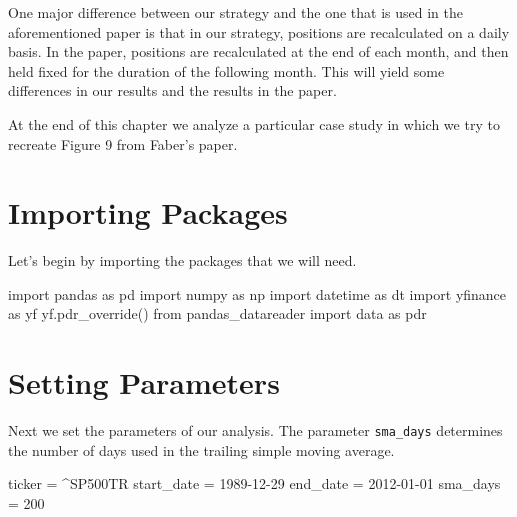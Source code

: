 \documentclass[
  letterpaper,
  DIV=11,
  numbers=noendperiod]{scrreprt}
\newenvironment{Shaded}{\begin{snugshade}}{\end{snugshade}}
\newcommand{\DecValTok}[1]{\textcolor[rgb]{0.68,0.00,0.00}{#1}}
\newcommand{\ImportTok}[1]{\textcolor[rgb]{0.00,0.46,0.62}{#1}}
\newcommand{\NormalTok}[1]{\textcolor[rgb]{0.00,0.23,0.31}{#1}}
\newcommand{\OperatorTok}[1]{\textcolor[rgb]{0.37,0.37,0.37}{#1}}
\newcommand{\StringTok}[1]{\textcolor[rgb]{0.13,0.47,0.30}{#1}}
\begin{document}
One major difference between our strategy and the one that is used in
the aforementioned paper is that in our strategy, positions are
recalculated on a daily basis. In the paper, positions are recalculated
at the end of each month, and then held fixed for the duration of the
following month. This will yield some differences in our results and the
results in the paper.

At the end of this chapter we analyze a particular case study in which
we try to recreate Figure 9 from Faber's paper.

\hypertarget{importing-packages-4}{%
\section{Importing Packages}\label{importing-packages-4}}

Let's begin by importing the packages that we will need.

\begin{Shaded}
\begin{Highlighting}[]
\ImportTok{import}\NormalTok{ pandas }\ImportTok{as}\NormalTok{ pd}
\ImportTok{import}\NormalTok{ numpy }\ImportTok{as}\NormalTok{ np}
\ImportTok{import}\NormalTok{ datetime }\ImportTok{as}\NormalTok{ dt}
\ImportTok{import}\NormalTok{ yfinance }\ImportTok{as}\NormalTok{ yf}
\NormalTok{yf.pdr\_override()}
\ImportTok{from}\NormalTok{ pandas\_datareader }\ImportTok{import}\NormalTok{ data }\ImportTok{as}\NormalTok{ pdr}
\end{Highlighting}
\end{Shaded}

\hypertarget{setting-parameters}{%
\section{Setting Parameters}\label{setting-parameters}}

Next we set the parameters of our analysis. The parameter
\texttt{sma\_days} determines the number of days used in the trailing
simple moving average.

\begin{Shaded}
\begin{Highlighting}[]
\NormalTok{ticker }\OperatorTok{=} \StringTok{\textquotesingle{}\^{}SP500TR\textquotesingle{}}
\NormalTok{start\_date }\OperatorTok{=} \StringTok{\textquotesingle{}1989{-}12{-}29\textquotesingle{}}
\NormalTok{end\_date }\OperatorTok{=} \StringTok{\textquotesingle{}2012{-}01{-}01\textquotesingle{}}
\NormalTok{sma\_days }\OperatorTok{=} \DecValTok{200}
\end{Highlighting}
\end{Shaded}
\end{document}
